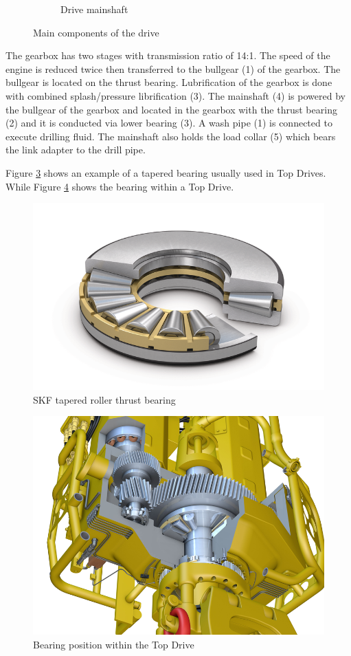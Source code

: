 \begin{figure}[h]
\begin{subfigure}[t]{0.4\textwidth}
	 \label{fig:topdrive-drillingunit-drive-mainshaft}
	 \caption{Drive mainshaft}
     \end{subfigure}
	\caption{Main components of the drive}%
	\label{fig:topdrive-drillingunit-drive-components}
\end{figure}

The gearbox has two stages with transmission ratio of 14:1. The speed of the engine is reduced twice then transferred to the bullgear (1) of the gearbox. The bullgear is located on the thrust bearing. Lubrification of the gearbox is done with combined splash/pressure librification (3). The mainshaft (4) is powered by the bullgear of the gearbox and located in the gearbox with the thrust bearing (2) and it is conducted via lower bearing (3). A wash pipe (1) is connected to execute drilling fluid. The mainshaft also holds the load collar (5) which bears the link adapter to the drill pipe. 

Figure \ref{fig:skf_tapered_roller_thrust_bearing} shows an example of a tapered bearing usually used in Top Drives. While Figure \ref{fig:skf_topdrive} shows the bearing within a Top Drive.

\begin{figure}[H]
	\centering
	\includegraphics[width=0.6\linewidth]{figures/skf_tapered_roller_thrust_bearing.png}
	\caption{SKF tapered roller thrust bearing \cite{skf_tapered_roller_thurst_bearing}}%
	\label{fig:skf_tapered_roller_thrust_bearing}
\end{figure}

\begin{figure}[H]
	\centering
	\includegraphics[width=0.7\linewidth]{figures/skf_topdrive.png}
	\caption{Bearing position within the Top Drive \cite{skf_bearing}}%
	\label{fig:skf_topdrive}
\end{figure}

